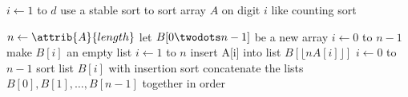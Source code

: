 \documentclass{article}
\begin{document}
\begin{codebox}
\li \For $i \gets 1$ to $d$
\li \Do
        use a stable sort to sort array $A$ on digit $i$ \Comment like counting sort
    \End
\end{codebox}

\begin{codebox}
\li $n \gets \attrib{A}{length}$
\li let $B[0 \twodots n-1]$ be a new array
\li \For $i \gets 0$ to $n-1$
\li     \Do
            make $B[i]$ an empty list
        \End
\li \For $i \gets 1$ to $n$
\li     \Do
            insert A[i] into list $B[\lfloor n A[i] \rfloor]$
        \End 
\li \For $i \gets 0$ to $n-1$
\li     \Do
            sort list $B[i]$ with insertion sort
        \End
\li concatenate the lists $B[0], B[1], \ldots, B[n-1]$ together in order
\end{codebox}
\end{document}
